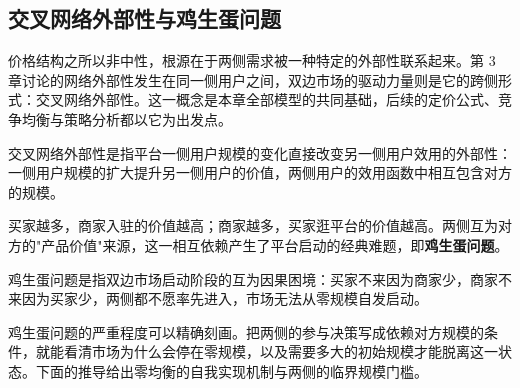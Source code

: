 \subsection{交叉网络外部性与鸡生蛋问题}

价格结构之所以非中性，根源在于两侧需求被一种特定的外部性联系起来。第 3 章讨论的网络外部性发生在同一侧用户之间，双边市场的驱动力量则是它的跨侧形式：交叉网络外部性。这一概念是本章全部模型的共同基础，后续的定价公式、竞争均衡与策略分析都以它为出发点。

\begin{definition}
交叉网络外部性是指平台一侧用户规模的变化直接改变另一侧用户效用的外部性：一侧用户规模的扩大提升另一侧用户的价值，两侧用户的效用函数中相互包含对方的规模。
\end{definition}

买家越多，商家入驻的价值越高；商家越多，买家逛平台的价值越高。两侧互为对方的"产品价值"来源，这一相互依赖产生了平台启动的经典难题，即\textbf{鸡生蛋问题}。

\begin{definition}
鸡生蛋问题是指双边市场启动阶段的互为因果困境：买家不来因为商家少，商家不来因为买家少，两侧都不愿率先进入，市场无法从零规模自发启动。
\end{definition}

鸡生蛋问题的严重程度可以精确刻画。把两侧的参与决策写成依赖对方规模的条件，就能看清市场为什么会停在零规模，以及需要多大的初始规模才能脱离这一状态。下面的推导给出零均衡的自我实现机制与两侧的临界规模门槛。

